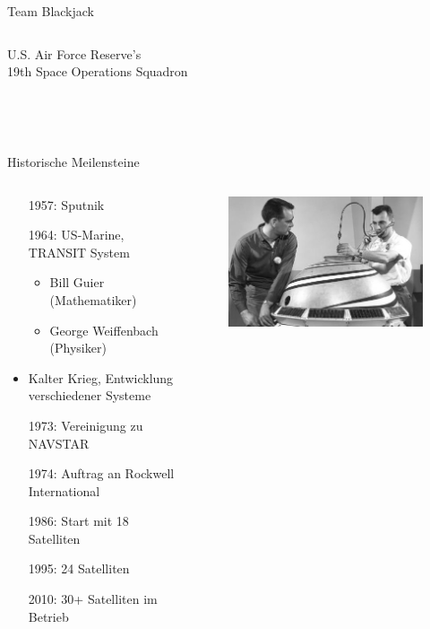 \begin{frame}{Team Blackjack}
\begin{columns}
\begin{column}{0.5\textwidth}
\begin{figure}
            \end{figure}
            U.S. Air Force Reserve's\\
            19th Space Operations Squadron
        \end{column}
    \end{columns}
    ~\\~\\
\end{frame}

\begin{frame}{Historische Meilensteine}
    \begin{columns}
        \begin{column}{0.5\textwidth}
            \begin{itemize}
                \item[1957:] Sputnik
                \item[1964:] US-Marine, TRANSIT System
                \begin{itemize}
                    \item Bill Guier (Mathematiker)
                    \item George Weiffenbach (Physiker)
                \end{itemize}
                \item Kalter Krieg, Entwicklung verschiedener Systeme
                \item[1973:] Vereinigung zu NAVSTAR
                \item[1974:] Auftrag an Rockwell International
                \item[1986:] Start mit 18 Satelliten
                \item[1995:] 24 Satelliten
                \item[2010:] 30+ Satelliten im Betrieb
            \end{itemize}
        \end{column}
        \begin{column}{0.35\textwidth}
            \begin{figure}
                \centering
                \includegraphics[width=0.35\paperwidth]{images/transit-satellite.jpg}

\end{figure}
\end{column}
\end{columns}
\end{frame}
